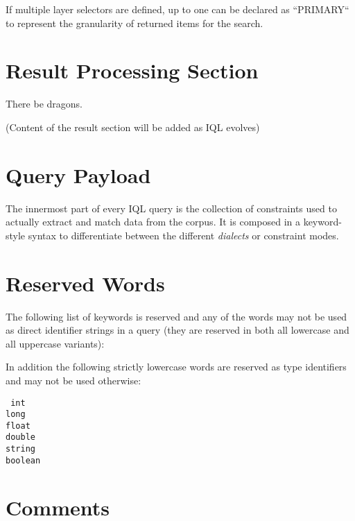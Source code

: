 \documentclass[11pt]{article}
\begin{document}
If multiple layer selectors are defined, up to one can be declared as ``PRIMARY`` to represent the granularity of returned items for the search.


\section{Result Processing Section}
\label{sec:result-processing}

There be dragons.

(Content of the result section will be added as IQL evolves)


\section{Query Payload}
\label{sec:query-payload}

The innermost part of every IQL query is the collection of constraints used to actually extract and match data from the corpus.
It is composed in a keyword-style syntax to differentiate between the different \textit{dialects} or constraint modes.

\section{Reserved Words}
\label{sec:reserved-words}

The following list of keywords is reserved and any of the words may not be used as direct identifier strings in a query (they are reserved in both all lowercase and all uppercase variants):

In addition the following strictly lowercase words are reserved as type identifiers and may not be used otherwise:

\begin{multicols}{3}
\parindent=0pt
\texttt{%
int\\
long\\
float\\
double\\
string\\
boolean\\
}
\end{multicols}

\section{Comments}
\label{sec:comments}
\end{document}
